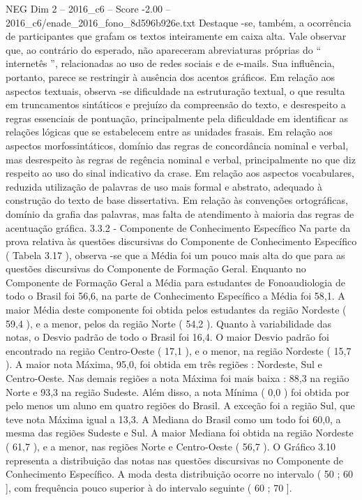 \begin{textsample}{NEG Dim 2 – 2016\_c6 – Score -2.00 – 2016\_c6/enade\_2016\_fono\_8d596b926e.txt}
Destaque -se, também, a ocorrência de participantes que grafam os textos inteiramente em caixa alta.
Vale observar que, ao contrário do esperado, não apareceram abreviaturas próprias do “ internetês ”, relacionadas ao uso de redes sociais e de e-mails.
Sua influência, portanto, parece se restringir à ausência dos acentos gráficos.
Em relação aos aspectos textuais, observa -se dificuldade na estruturação textual, o que resulta em truncamentos sintáticos e prejuízo da compreensão do texto, e desrespeito a regras essenciais de pontuação, principalmente pela dificuldade em identificar as relações lógicas que se estabelecem entre as unidades frasais.
Em relação aos aspectos morfossintáticos, domínio das regras de concordância nominal e verbal, mas desrespeito às regras de regência nominal e verbal, principalmente no que diz respeito ao uso do sinal indicativo da crase.
Em relação aos aspectos vocabulares, reduzida utilização de palavras de uso mais formal e abstrato, adequado à construção do texto de base dissertativa.
Em relação às convenções ortográficas, domínio da grafia das palavras, mas falta de atendimento à maioria das regras de acentuação gráfica. 3.3.2 - Componente de Conhecimento Específico Na parte da prova relativa às questões discursivas do Componente de Conhecimento Específico ( Tabela 3.17 ), observa -se que a Média foi um pouco mais alta do que para as questões discursivas do Componente de Formação Geral.
Enquanto no Componente de Formação Geral a Média para estudantes de Fonoaudiologia de todo o Brasil foi 56,6, na parte de Conhecimento Específico a Média foi 58,1.
A maior Média deste componente foi obtida pelos estudantes da região Nordeste ( 59,4 ), e a menor, pelos da região Norte ( 54,2 ).
Quanto à variabilidade das notas, o Desvio padrão de todo o Brasil foi 16,4.
O maior Desvio padrão foi encontrado na região Centro-Oeste ( 17,1 ), e o menor, na região Nordeste ( 15,7 ).
A maior nota Máxima, 95,0, foi obtida em três regiões : Nordeste, Sul e Centro-Oeste.
Nas demais regiões a nota Máxima foi mais baixa : 88,3 na região Norte e 93,3 na região Sudeste.
Além disso, a nota Mínima ( 0,0 ) foi obtida por pelo menos um aluno em quatro regiões do Brasil.
A exceção foi a região Sul, que teve nota Máxima igual a 13,3.
A Mediana do Brasil como um todo foi 60,0, a mesma das regiões Sudeste e Sul.
A maior Mediana foi obtida na região Nordeste ( 61,7 ), e a menor, nas regiões Norte e Centro-Oeste ( 56,7 ).
O Gráfico 3.10 representa a distribuição das notas nas questões discursivas no Componente de Conhecimento Específico.
A moda desta distribuição ocorre no intervalo ( 50 ; 60 ], com frequência pouco superior à do intervalo seguinte ( 60 ; 70 ].

\end{textsample}
